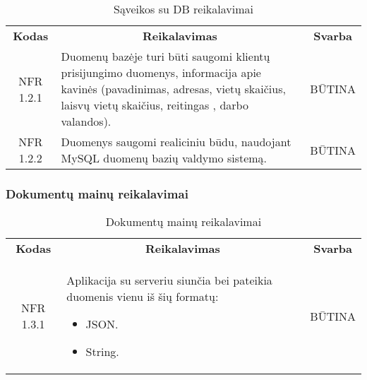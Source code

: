 \documentclass{VUMIFPSkursinis}
\begin{document}
\begin{center}
	\begin{table}[H]
	\begin{tabular}{|p{2cm}|p{}|p{}|}
	\hline
	    \rowcolor{lightgray}
		\multicolumn{3}{|c|}{Sąveikos su DB reikalavimai}\\
		
	\hline
		\multicolumn{1}{|c|}{{\bfseries Kodas}}&
		\multicolumn{1}{|c|}{{\bfseries Reikalavimas}}&
		\multicolumn{1}{|c|}{{\bfseries Svarba}}\\
	\hline 	
		\multicolumn{1}{|c|}{NFR 1.2.1}&
		{Duomenų bazėje turi būti saugomi klientų prisijungimo duomenys, informacija apie kavinės (pavadinimas, adresas, vietų skaičius, laisvų vietų skaičius, reitingas , darbo valandos).}&
		\multicolumn{1}{|c|}{BŪTINA}\\	
	
	\hline 	
		\multicolumn{1}{|c|}{NFR 1.2.2}&
		{Duomenys saugomi realiciniu būdu, naudojant MySQL duomenų bazių valdymo sistemą.}&
		\multicolumn{1}{|c|}{BŪTINA}\\	
	
	\hline  	 	
	\end{tabular}
	\caption{Sąveikos su DB reikalavimai}
	\label{table:SąveikossuDBreikalavimai}
	\end{table}

\end{center}

\subsubsection{Dokumentų mainų reikalavimai}

\begin{center}
	\begin{table}[H]
	\begin{tabular}{|p{2cm}|p{}|p{}|}
	\hline
	    \rowcolor{lightgray}
		\multicolumn{3}{|c|}{Dokumentų mainų reikalavimai}\\
		
	\hline
		\multicolumn{1}{|c|}{{\bfseries Kodas}}&
		\multicolumn{1}{|c|}{{\bfseries Reikalavimas}}&
		\multicolumn{1}{|c|}{{\bfseries Svarba}}\\
	\hline 	
		\multicolumn{1}{|c|}{NFR 1.3.1}&
		{Aplikacija su serveriu siunčia bei pateikia duomenis vienu iš šių formatų:
			\begin{itemize}
			\item JSON.
			\item String.
			\end{itemize}}&
		\multicolumn{1}{|c|}{BŪTINA}\\	
	
	\hline 	 	 	
	\end{tabular}
	\caption{Dokumentų mainų reikalavimai}
	\label{table:Dokumentųmainųreikalavimai}
	\end{table}

\end{center}
\end{document}
